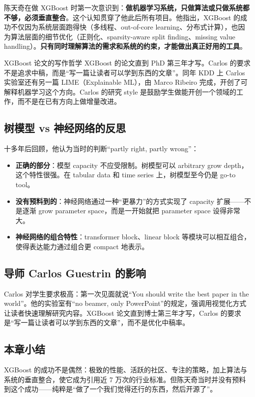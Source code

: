 陈天奇在做 XGBoost 时第一次意识到：\textbf{做机器学习系统，只做算法或只做系统都不够，必须垂直整合}。这个认知贯穿了他此后所有项目。他指出，XGBoost 的成功不仅因为系统层面跑得快（多线程、out-of-core learning、分布式计算），也因为算法层面的细节优化（正则化、sparsity-aware split finding、missing value handling）。\textbf{只有同时理解算法的需求和系统的约束，才能做出真正好用的工具}。

\begin{knowledgebox}{XGBoost 论文的写作哲学}
XGBoost 的论文直到 PhD 第三年才写。Carlos 的要求不是追求中稿，而是``写一篇让读者可以学到东西的文章''。同年 KDD 上 Carlos 实验室还有另一篇 LIME（Explainable ML），由 Marco Ribeiro 完成，开创了可解释机器学习这个方向。Carlos 的研究 style 是鼓励学生做能开创一个领域的工作，而不是在已有方向上做增量改进。
\end{knowledgebox}

\subsection{树模型 vs 神经网络的反思}

十多年后回顾，他认为当时的判断``partly right, partly wrong''：

\begin{itemize}
    \item \textbf{正确的部分}：模型 capacity 不应受限制。树模型可以 arbitrary grow depth，这个特性很强。在 tabular data 和 time series 上，树模型至今仍是 go-to tool。
    \item \textbf{没有预料到的}：神经网络通过一种``更暴力''的方式实现了 capacity 扩展------不是逐渐 grow parameter space，而是一开始就把 parameter space 设得非常大。
    \item \textbf{神经网络的组合特性}：transformer block、linear block 等模块可以相互组合，使得表达能力通过组合更 compact 地表示。
\end{itemize}

\subsection{导师 Carlos Guestrin 的影响}

Carlos 对学生要求极高：第一次见面就说``You should write the best paper in the world''。他的实验室有``no beamer, only PowerPoint''的规定，强调用视觉化方式让读者快速理解研究内容。XGBoost 论文直到博士第三年才写，Carlos 的要求是``写一篇让读者可以学到东西的文章''，而不是优化中稿率。

\subsection{本章小结}

XGBoost 的成功不是偶然：极致的性能、活跃的社区、专注的策略，加上算法与系统的垂直整合，使它成为引用近 7 万次的行业标准。但陈天奇当时并没有预料到这个成功------纯粹是``做了一个我们觉得还行的东西，然后开源了''。

